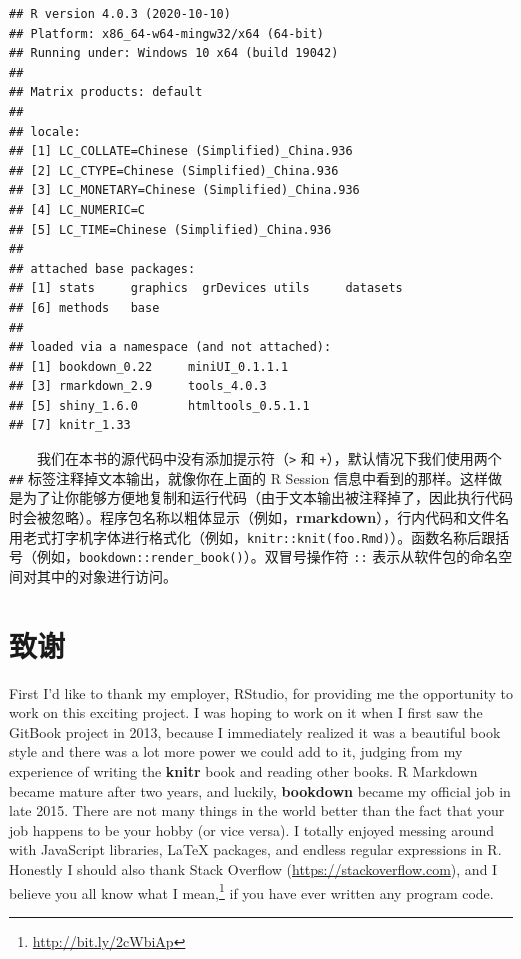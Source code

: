 \documentclass[
  12pt,
]{krantz}
\renewcommand{\href}[2]{#2\footnote{\url{#1}}}
\theoremstyle{definition}
\theoremstyle{definition}
\theoremstyle{definition}
\theoremstyle{definition}
\theoremstyle{remark}
\begin{document}
\begin{verbatim}
## R version 4.0.3 (2020-10-10)
## Platform: x86_64-w64-mingw32/x64 (64-bit)
## Running under: Windows 10 x64 (build 19042)
## 
## Matrix products: default
## 
## locale:
## [1] LC_COLLATE=Chinese (Simplified)_China.936 
## [2] LC_CTYPE=Chinese (Simplified)_China.936   
## [3] LC_MONETARY=Chinese (Simplified)_China.936
## [4] LC_NUMERIC=C                              
## [5] LC_TIME=Chinese (Simplified)_China.936    
## 
## attached base packages:
## [1] stats     graphics  grDevices utils     datasets 
## [6] methods   base     
## 
## loaded via a namespace (and not attached):
## [1] bookdown_0.22     miniUI_0.1.1.1   
## [3] rmarkdown_2.9     tools_4.0.3      
## [5] shiny_1.6.0       htmltools_0.5.1.1
## [7] knitr_1.33
\end{verbatim}

  我们在本书的源代码中没有添加提示符（\texttt{\textgreater{}} 和 \texttt{+}），默认情况下我们使用两个 \texttt{\#\#} 标签注释掉文本输出，就像你在上面的 R Session 信息中看到的那样。这样做是为了让你能够方便地复制和运行代码（由于文本输出被注释掉了，因此执行代码时会被忽略）。程序包名称以粗体显示（例如，\textbf{rmarkdown}），行内代码和文件名用老式打字机字体进行格式化（例如，\texttt{knitr::knit(\textquotesingle{}foo.Rmd\textquotesingle{})}）。函数名称后跟括号（例如，\texttt{bookdown::render\_book()}）。双冒号操作符 \texttt{::} 表示从软件包的命名空间对其中的对象进行访问。

\hypertarget{ux81f4ux8c22}{%
\section*{致谢}\label{ux81f4ux8c22}}


First I'd like to thank my employer, RStudio, for providing me the opportunity to work on this exciting project. I was hoping to work on it when I first saw the GitBook project in 2013, because I immediately realized it was a beautiful book style and there was a lot more power we could add to it, judging from my experience of writing the \textbf{knitr} book \citep{xie2015} and reading other books. R Markdown became mature after two years, and luckily, \textbf{bookdown} became my official job in late 2015. There are not many things in the world better than the fact that your job happens to be your hobby (or vice versa). I totally enjoyed messing around with JavaScript libraries, LaTeX packages, and endless regular expressions in R. Honestly I should also thank Stack Overflow (\url{https://stackoverflow.com}), and I believe you all know \href{http://bit.ly/2cWbiAp}{what I mean,} if you have ever written any program code.
\end{document}
